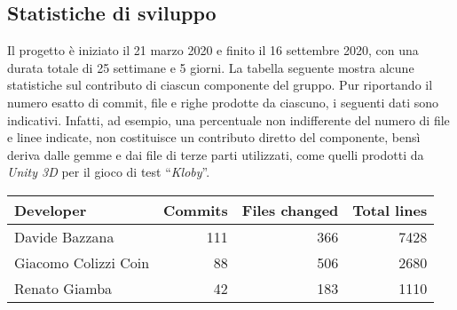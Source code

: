 \subsection{Statistiche di sviluppo}

Il progetto è iniziato il 21 marzo 2020 e finito il 16 settembre
2020, con una durata totale di 25 settimane e 5 giorni.
\newline
\newline
La tabella seguente mostra alcune statistiche sul contributo di
ciascun componente del gruppo. Pur riportando il numero esatto di
commit, file e righe prodotte da ciascuno, i seguenti dati sono
indicativi. Infatti, ad esempio, una percentuale non indifferente del
numero di file e linee indicate, non costituisce un contributo diretto
del componente, bensì deriva dalle gemme e dai file di terze parti
utilizzati, come quelli prodotti da \textit{Unity 3D} per il
gioco di test ``\textit{Kloby}''.

\vspace{1cm}
\begin{tabular}{l|r|r|r}
  \textbf{Developer} & \textbf{Commits} & \textbf{Files changed} & \textbf{Total lines} \\
  \hline
  Davide Bazzana & 111 & 366 & 7428 \\
  \hline
  Giacomo Colizzi Coin & 88 & 506 & 2680 \\
  \hline
  Renato Giamba & 42 & 183 & 1110 \\
  \hline
\end{tabular}
